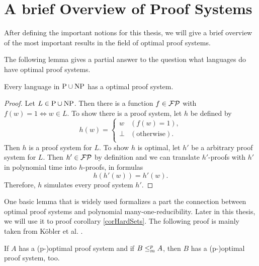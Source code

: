 \chapter{A brief Overview of Proof Systems}
  After defining the important notions for this thesis, we will give a brief overview of the most important results in the field of optimal proof systems.

  The following lemma gives a partial answer to the question what languages do have optimal proof systems.

  \begin{lemma}
   Every language in \(\text{P} \cup \text{NP}\) has a optimal proof system.
  \end{lemma}

  \begin{proof}
    Let \(L \in \text{P} \cup \text{NP}\). Then there is a function \(f \in \mathcal{FP}\) with \(f(w) = 1 \Leftrightarrow w \in L\). To show there is a proof system, let \(h\) be defined by
    \[
      h(w) =
      \begin{cases}
        w & (f(w) = 1), \\
        \perp & (\text{otherwise}). \\
      \end{cases}
    \]
    Then \(h\) is a proof system for \(L\). To show \(h\) is optimal, let \(h'\) be a arbitrary proof system for \(L\). Then \(h' \in \mathcal{FP}\) by definition and we can translate \(h'\)-proofs with \(h'\) in polynomial time into \(h\)-proofs, in formulas
    \[
      h(h'(w)) = h'(w).
    \]
    Therefore, \(h\) simulates every proof system \(h'\).
  \end{proof}

  One basic lemma that is widely used formalizes a part the connection between optimal proof systems and polynomial many-one-reducibility. Later in this thesis, we will use it to proof corollary \ref{corHardSets}. The following proof is mainly taken from Köbler et al. \cite{KMT03}.

  \begin{lemma} \label{lemManyOneProofSystem}
    If \(A\) has a (p-)optimal proof system and if \(B \leq_{m}^{p} A\), then \(B\) has a (p-)optimal proof system, too.
  \end{lemma}

